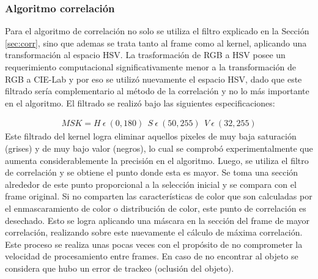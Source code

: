 \subsubsection{Algoritmo correlación}
Para el algoritmo de correlación no solo se utiliza el filtro explicado en la Sección \ref{sec:corr}, sino que ademas se trata tanto al frame como al kernel, aplicando una transformación al espacio HSV. La trasformación de RGB a HSV posee un requerimiento computacional significativamente menor a la transformación de RGB a CIE-Lab y por eso se utilizó nuevamente el espacio HSV, dado que este filtrado sería complementario al método de la correlación y no lo más importante en el algoritmo. El filtrado se realizó bajo las siguientes especificaciones: 
            
\begin{align}
MSK = H \  \epsilon \ (0,180 ) \ \ S \  \epsilon \ (50,255) \ \ V \ \epsilon \ (32,255)
\end{align}
Este filtrado del kernel logra eliminar aquellos pixeles de muy baja saturación (grises) y de muy bajo valor (negros), lo cual se comprobó experimentalmente que aumenta considerablemente la precisión en el algoritmo.
Luego, se utiliza el filtro de correlación y se obtiene el punto donde esta es mayor. Se toma una sección alrededor de este punto proporcional a la selección inicial y se compara con el frame original. Si no comparten las características de color que son calculadas por el enmascaramiento de color o distribución de color, este punto de correlación es desechado. Esto se logra aplicando una máscara en la sección del frame de mayor correlación, realizando sobre este nuevamente el cálculo de máxima correlación. Este proceso se realiza unas pocas veces con el propósito de no comprometer la velocidad de procesamiento entre frames. En caso de no encontrar al objeto se considera que hubo un error de trackeo (oclusión del objeto).\\

